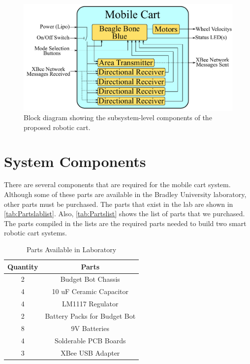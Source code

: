 \begin{figure}[h!]
  \centering
  \includegraphics[scale=0.82]{figs/mobile_cart_block_diagram}
  \caption{Block diagram showing the subsystem-level components of the proposed robotic cart.}
  \label{fig:mobile_block_diag}
\end{figure}


\section{System Components}
There are several components that are required for the mobile cart system. Although some of these parts are available in the Bradley University laboratory, other parts must be purchased. The parts that exist in the lab are shown in \autoref{tab:Partslablist}. Also, \autoref{tab:Partslist} shows the list of parts that we purchased. The parts compiled in the lists are the required parts needed to build two smart robotic cart systems.

\begin{table}[h!]
  \centering
  \begin{tabular}{c|c}
      \toprule
      \textbf{Quantity} & \textbf{Parts}\\
      \toprule
      2 & Budget Bot Chassis\\
      4 & 10 uF Ceramic Capacitor\\
      4 & LM1117 Regulator\\
      2 & Battery Packs for Budget Bot\\
      8 & 9V Batteries\\
      4 & Solderable PCB Boards\\
      3 & XBee USB Adapter\\
      \bottomrule
  \end{tabular}
  \caption{Parts Available in Laboratory}
  \label{tab:Partslablist}
\end{table}

